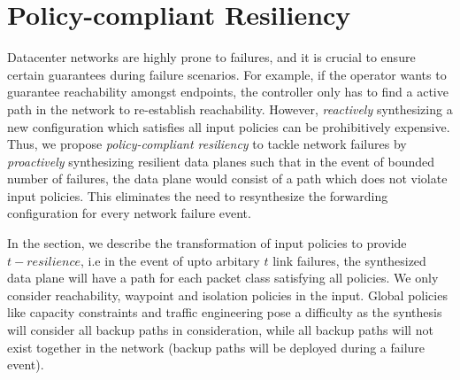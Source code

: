 \section{Policy-compliant Resiliency}
Datacenter networks are highly prone to failures\cite{datacenterfailures}, 
and it is crucial to ensure certain guarantees during failure
scenarios. For example, if the operator wants to guarantee
reachability amongst endpoints, the controller only has to find a active
path in the network to re-establish reachability. 
However, {\em reactively} synthesizing a new configuration which satisfies
all input policies can be prohibitively expensive.
Thus, we propose 
\emph{policy-compliant resiliency} to tackle network failures
by \emph{proactively} synthesizing resilient data planes such that in the event
of bounded number of failures, the data plane would consist of a 
path which does not violate input policies. This eliminates the 
need to resynthesize the forwarding
configuration for every network failure event.

In the section, we describe the transformation of input 
policies to provide $t-resilience$, i.e in the event of upto arbitary
$t$ link failures, the synthesized data plane will have a path
for each packet class  satisfying all policies. We only consider reachability, waypoint
and isolation policies in the input. Global policies like capacity constraints
and traffic engineering pose a difficulty as the synthesis will consider
all backup paths in consideration, while all backup paths will not 
exist together in the network (backup paths will be deployed during
a failure event). 

